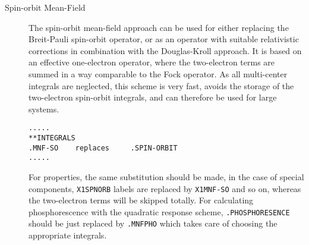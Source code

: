 \begin{description}
\begin{center}
\end{center}

\item[Spin-orbit Mean-Field] The spin-orbit mean-field approach can be used 
for either replacing the Breit-Pauli spin-orbit operator, or as an operator 
with suitable relativistic corrections in combination with the Douglas-Kroll 
approach. It is based on an effective one-electron operator, where the two-electron
terms are summed in a way comparable to the Fock operator. As all multi-center 
integrals are neglected, this scheme is very fast, avoids the storage of the 
two-electron spin-orbit integrals, and can therefore be used for large systems. 

\begin{verbatim}
.....
**INTEGRALS    
.MNF-SO    replaces     .SPIN-ORBIT             
.....
\end{verbatim}

For properties, the same substitution should be made, in the case of special 
components, \verb|X1SPNORB| labels are replaced by \verb|X1MNF-SO| and so on, whereas the 
two-electron terms will be skipped totally. For calculating phosphorescence with 
the quadratic response scheme, \verb|.PHOSPHORESENCE| should be just replaced by 
\verb|.MNFPHO| which takes care of choosing the appropriate integrals. 


\begin{center}
\end{center}



\end{description}
